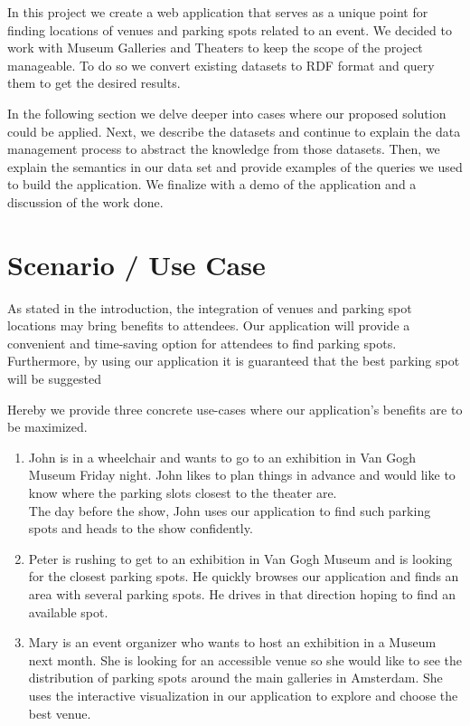 \documentclass[runningheads,a4paper]{../../StyleFiles/llncs}
\begin{document}
In this project we create a web application that serves as a unique point for finding locations of venues and parking spots related to an event. We decided to work with Museum Galleries and Theaters to keep the scope of the project manageable. To do so we convert existing datasets to RDF format and query them to get the desired results.

In the following section we delve deeper into cases where our proposed solution could be applied. Next, we describe the datasets and continue to explain the data management process to abstract the knowledge from those datasets. Then, we explain the semantics in our data set and provide examples of the queries we used to build the application. We finalize with a demo of the application and a discussion of the work done.  

\section{Scenario / Use Case}

As stated in the introduction, the integration of venues and parking spot locations may bring benefits to attendees. Our application will provide a convenient and time-saving option for attendees to find parking spots. Furthermore, by using our application it is guaranteed that the best parking spot will be suggested %

Hereby we provide three concrete use-cases where our application's benefits are to be maximized.

\begin{enumerate}
	\item John is in a wheelchair and wants to go to an exhibition in Van Gogh Museum Friday night. John likes to plan things in advance and would like to know where the parking slots closest to the theater are. \\
	The day before the show, John uses our application to find such parking spots and heads to the show confidently. 
	\item Peter is rushing to get to an exhibition in Van Gogh Museum and is looking for the closest parking spots. He quickly browses our application and finds an area with several parking spots. He drives in that direction hoping to find an available spot. 
	\item Mary is an event organizer who wants to host an exhibition in a Museum next month. She is looking for an accessible venue so she would like to see the distribution of parking spots around the main galleries in Amsterdam. She uses the interactive visualization in our application to explore and choose the best venue.
\end{enumerate}
\end{document}
